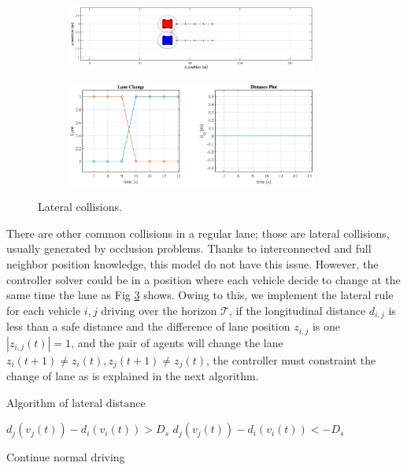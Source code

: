 \begin{figure}
\begin{subfigure}
\centering
    \includegraphics[width=0.9\textwidth]{Kap3/untitled.eps}
    \label{fig:lat_col1}
\end{subfigure}%
\begin{subfigure}
\centering
    \includegraphics[width=0.9\textwidth]{Kap3/plot_change_line.eps}
    \label{fig:lat_col2}
\end{subfigure}%
\caption{Lateral collisions.}
\label{fig:lat_col}
\end{figure}

There are other common collisions in a regular lane; those are lateral collisions, usually generated by occlusion problems. Thanks to interconnected and full neighbor position knowledge, this model do not have this issue. However, the controller solver could be in a position where each vehicle decide to change at the same time the lane as Fig \ref{fig:lat_col} shows. Owing to this, we implement the lateral rule for each vehicle $i,j$ driving over the horizon $\mathcal{T}$, if the longitudinal distance $d_{i,j}$ is less than a safe distance and the difference of lane position $z_{i,j}$ is one $\left| z_{i,j} (t) \right|=1$, and the pair of agents will change the lane $z_{i} (t+1) \neq z_{i} (t), z_{j} (t+1) \neq z_{j} (t)$, the controller must constraint the change of lane as is explained in the next algorithm.

\begin{algorithm}
\caption{Algorithm of lateral distance}\label{alg:lat_saf}
\begin{algorithmic}
        \State $d_j(v_j(t)) -d_i(v_i(t)) > D_s$
        \State $d_j(v_j(t)) -d_i(v_i(t)) < -D_s$
    \Else
        
        \State Continue normal driving
    \EndIf
\EndIf

\end{algorithmic}
\end{algorithm}

